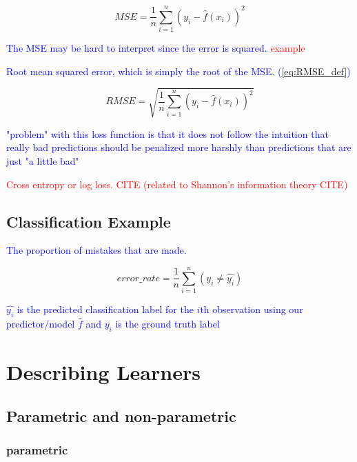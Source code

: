 \begin{equation}
{MSE = \frac{1}{n}\sum_{i=1}^{n}(y_i - \hat{f}(x_i))^2}
\label{eq:MSE_def}
\end{equation}

\textcolor{blue}{The MSE may be hard to interpret since the error is squared. \textcolor{red}{example}}

\textcolor{blue}{Root mean squared error, which is simply the root of the MSE. (\ref{eq:RMSE_def})}

\begin{equation}
{RMSE = \sqrt{\frac{1}{n}\sum_{i=1}^{n}(y_i - \hat{f}(x_i))^2}}
\label{eq:RMSE_def}
\end{equation}

\textcolor{blue}{"problem" with this loss function is that it does not follow the intuition that really bad predictions should be penalized more harshly than predictions that are just "a little bad"}

\textcolor{red}{Cross entropy or log loss. \textcolor{red}{CITE} (related to Shannon's information theory \textcolor{red}{CITE})}



\subsection{Classification Example}

\textcolor{blue}{The proportion of mistakes that are made.}

\begin{equation}
{error\_rate = \frac{1}{n}\sum_{i=1}^{n}(y_i \ne \hat{y_i})}
\label{eq:class_error_rate_def}
\end{equation}

\textcolor{blue}{$\hat{y_i}$ is the predicted classification label for the $i$th observation using our predictor/model $\hat{f}$ and $y_i$ is the ground truth label}

\section{Describing Learners}

\subsection{Parametric and non-parametric}

\subsubsection{parametric}

